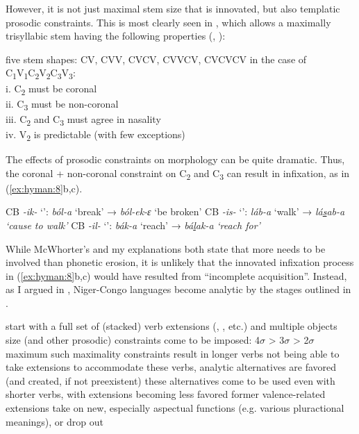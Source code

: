 \documentclass[output=paper]{langsci/langscibook}
\begin{document}
  However, it is not just maximal stem size that is innovated, but also templatic prosodic constraints. This is most clearly seen in , which allows a maximally trisyllabic stem having the following properties (\citealt{Ellington1977}, \citealt{Hyman2010}):


\ea
\label{ex:hyman:7}
\ea
five stem shapes:   CV, CVV, CVCV, CVVCV, CVCVCV
\ex 
in the case of C\textsubscript{1}V\textsubscript{1}C\textsubscript{2}V\textsubscript{2}C\textsubscript{3}V\textsubscript{3}: \\ 
    i.  C\textsubscript{2} must be coronal   \\ 
    ii.  C\textsubscript{3} must be non-coronal \\
    iii.  C\textsubscript{2} and C\textsubscript{3} must agree in nasality\\
    iv.  V\textsubscript{2} is predictable (with few exceptions)  
    \z 
\z 

\noindent
The effects of prosodic constraints on morphology can be quite dramatic. Thus, the coronal + non-coronal constraint on C\textsubscript{2} and C\textsubscript{3} can result in infixation, as in (\ref{ex:hyman:8}b,c).

\ea
\label{ex:hyman:8}
\ea 
CB \textit{-ik-} ‘’:  \textit{ból-a}  ‘break’  →  \textit{ból-ek-ɛ}  ‘be broken’
\ex 
CB \textit{-is-} ‘’:   \textit{láb-a}  ‘walk’  →   \textit{lá\ul{s}ab-a}    \textit{‘cause to walk’}
\ex 
CB \textit{-il-} ‘’:  \textit{bák-a}  ‘reach’  →  \textit{bá\ul{l}ak-a}  \textit{‘reach for’}
  \z 
\z 

  {While McWhorter’s and my explanations both state that more needs to be involved than phonetic erosion, it is unlikely that the innovated infixation process in (\ref{ex:hyman:8}b,c) would have resulted from “incomplete acquisition”. Instead, as I argued in \citet{Hyman2004}, Niger-Congo languages become analytic by the stages outlined in .}

\ea
\label{ex:hyman:9}
\ea 
start with a full set of (stacked) verb extensions (, , etc.) and multiple objects
\ex 
size (and other prosodic) constraints come to be imposed: 4${\sigma}$ {\textgreater} 3${\sigma}$ {\textgreater} 2${\sigma}$ maximum
\ex 
such maximality constraints result in longer verbs not being able to take extensions
\ex 
to accommodate these verbs, analytic alternatives are favored (and created, if not preexistent)
\ex 
these alternatives come to be used even with shorter verbs, with extensions becoming less favored
\ex 
former valence-related extensions take on new, especially aspectual functions (e.g. various pluractional meanings), or drop out
\z 
\z 
\end{document}
